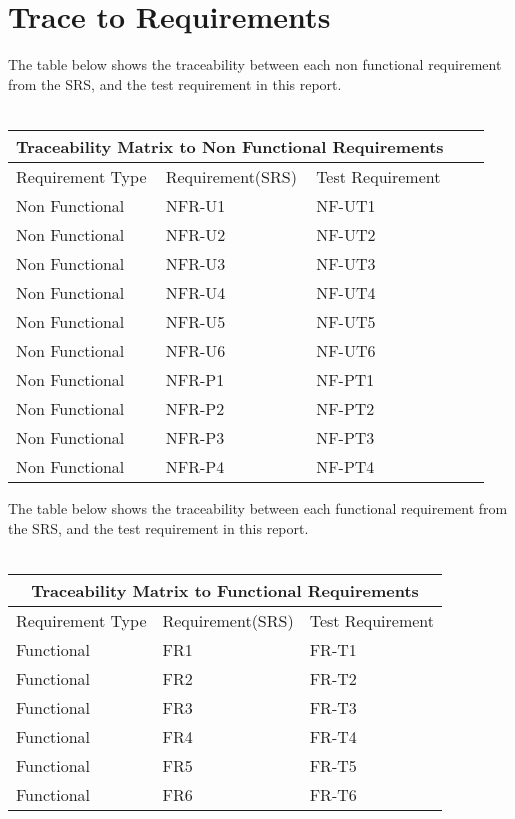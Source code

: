 \documentclass[12pt, titlepage]{article}
\begin{document}
\section{Trace to Requirements}
The table below shows the traceability between each non functional requirement from the SRS, and the test requirement in this report.\\
\\
\begin{tabular}{ |p{3cm}||p{4cm}|p{4cm}|p{4cm}|p{4cm}| }
  \hline
  \multicolumn{3}{|c|}{Traceability Matrix to Non Functional Requirements} \\
  \hline
  Requirement Type & Requirement(SRS) & Test Requirement \\
  \hline
  Non Functional   & NFR-U1  & NF-UT1  \\ \hline
  Non Functional   & NFR-U2  & NF-UT2  \\ \hline
  Non Functional   & NFR-U3  & NF-UT3  \\ \hline
  Non Functional   & NFR-U4  & NF-UT4  \\ \hline
  Non Functional   & NFR-U5  & NF-UT5   \\ \hline
  Non Functional   & NFR-U6  & NF-UT6  \\ \hline
  Non Functional   & NFR-P1  & NF-PT1  \\ \hline
  Non Functional   & NFR-P2  & NF-PT2  \\ \hline
  Non Functional   & NFR-P3  & NF-PT3  \\ \hline
  Non Functional   & NFR-P4  & NF-PT4  \\ \hline
  
 \end{tabular}

 The table below shows the traceability between each functional requirement from the SRS, and the test requirement in this report.\\
\\
 \begin{tabular}{ |p{3cm}||p{4cm}|p{4cm}| }
  \hline
  \multicolumn{3}{|c|}{Traceability Matrix to Functional Requirements} \\
  \hline
  Requirement Type & Requirement(SRS) & Test Requirement \\
  \hline
  Functional   & FR1  & FR-T1 \\ \hline
  Functional   & FR2  & FR-T2  \\ \hline
  Functional   & FR3  & FR-T3 \\ \hline
  Functional   & FR4  & FR-T4  \\ \hline
  Functional   & FR5  & FR-T5  \\ \hline
  Functional   & FR6  & FR-T6 \\ \hline
  
 \end{tabular}
		
\end{document}
